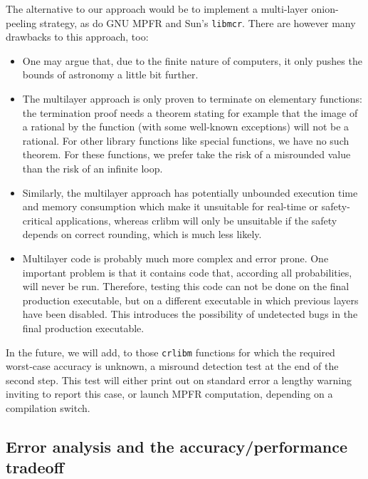 The alternative to our approach would be to implement a
multi-layer onion-peeling strategy, as do GNU MPFR and Sun's
\texttt{libmcr}. There are however many drawbacks to this approach, too:

\begin{itemize}

\item One may argue that, due to the finite nature of computers, it
  only pushes the bounds of astronomy a little bit further.

\item The multilayer approach is only proven to terminate on
  elementary functions: the termination proof needs a theorem stating
  for example that the image of a rational by the function (with some
  well-known exceptions) will not be a rational. For other library
  functions like  special functions, we have no such theorem.
  For these functions, we prefer take the risk of a misrounded
  value than the risk of an infinite loop.

\item Similarly, the multilayer approach has potentially unbounded
  execution time and memory consumption which make it unsuitable for
  real-time or safety-critical applications, whereas crlibm will only
  be unsuitable if the safety depends on correct rounding, which is
  much less likely.

\item Multilayer code is probably much more complex and error prone.
  One important problem is that it contains code that, according all
  probabilities, will never be run. Therefore, testing this code can
  not be done on the final production executable, but on a different
  executable in which previous layers have been disabled. This
  introduces the possibility of undetected bugs in the final
  production executable.

\end{itemize}

In the future, we will add, to those \texttt{crlibm} functions for
which the required worst-case accuracy is unknown, a misround
detection test at the end of the second step. This test will either
print out on standard error a lengthy warning inviting to report this
case, or launch MPFR computation, depending on a compilation switch.



\subsection{Error analysis and the accuracy/performance tradeoff
  \label{sec:error-accuracy-perf}}

